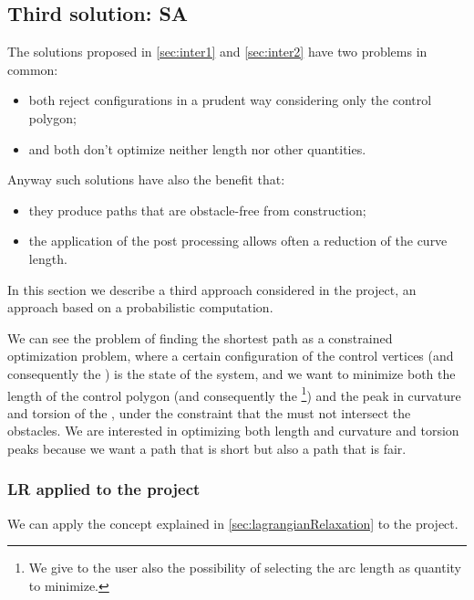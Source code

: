 \documentclass[dissertation.tex]{subfiles}
\begin{document}
\subsection{Third solution: \acf{SA}}\label{sec:inter3}
The solutions proposed in \cref{sec:inter1} and \cref{sec:inter2} have two
problems in common:
\begin{itemize}
\item both reject configurations in a prudent way
  considering only the control polygon;
\item and both don't optimize neither
  length nor other quantities.
\end{itemize}
Anyway such solutions have also the benefit that:
\begin{itemize}
\item they produce paths that are obstacle-free from construction;
\item the application of the post processing allows often a reduction
  of the curve length.
\end{itemize}

In this section we describe a third
approach considered in the project, an approach based on a
probabilistic computation.
    
We can see the problem of finding the shortest path as a constrained
optimization problem, where a certain configuration of the control
vertices (and
consequently the \bs) is the state of the system, and we want to
minimize both the length of the control polygon (and consequently the
\bs\footnote{We give to the user also the possibility of selecting the
  arc length as quantity to minimize.}) and the peak in curvature and torsion of the \bs, under
the constraint that the \bs must not intersect the obstacles. We
are interested in optimizing both length and curvature and torsion
peaks because we want a path that is short but also a path that is
fair.

\subsubsection{\acf{LR} applied to the project}
We can apply the concept explained in \cref{sec:lagrangianRelaxation}
to the project.
\end{document}
